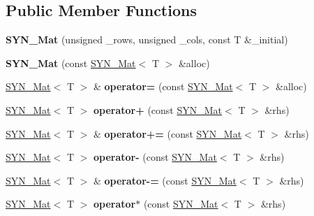 \subsection*{Public Member Functions}
\begin{DoxyCompactItemize}
\item 
\mbox{\label{classSYN__Mat_a81e0af5a7bd32ed70b44f319fc8edc39}} 
{\bfseries S\+Y\+N\+\_\+\+Mat} (unsigned \+\_\+rows, unsigned \+\_\+cols, const T \&\+\_\+initial)
\item 
\mbox{\label{classSYN__Mat_ab6ae892453033358fb394eb337f9722e}} 
{\bfseries S\+Y\+N\+\_\+\+Mat} (const \hyperlink{classSYN__Mat}{S\+Y\+N\+\_\+\+Mat}$<$ T $>$ \&alloc)
\item 
\mbox{\label{classSYN__Mat_a8c26c6e94cafc98eabd4507859a8ef46}} 
\hyperlink{classSYN__Mat}{S\+Y\+N\+\_\+\+Mat}$<$ T $>$ \& {\bfseries operator=} (const \hyperlink{classSYN__Mat}{S\+Y\+N\+\_\+\+Mat}$<$ T $>$ \&alloc)
\item 
\mbox{\label{classSYN__Mat_aab586b6842b14d810db853f0b44bb0d9}} 
\hyperlink{classSYN__Mat}{S\+Y\+N\+\_\+\+Mat}$<$ T $>$ {\bfseries operator+} (const \hyperlink{classSYN__Mat}{S\+Y\+N\+\_\+\+Mat}$<$ T $>$ \&rhs)
\item 
\mbox{\label{classSYN__Mat_ab28a10ef6248599f000585dd1ac52f2b}} 
\hyperlink{classSYN__Mat}{S\+Y\+N\+\_\+\+Mat}$<$ T $>$ \& {\bfseries operator+=} (const \hyperlink{classSYN__Mat}{S\+Y\+N\+\_\+\+Mat}$<$ T $>$ \&rhs)
\item 
\mbox{\label{classSYN__Mat_a604d9395da807c16a38ee58ccbd9626a}} 
\hyperlink{classSYN__Mat}{S\+Y\+N\+\_\+\+Mat}$<$ T $>$ {\bfseries operator-\/} (const \hyperlink{classSYN__Mat}{S\+Y\+N\+\_\+\+Mat}$<$ T $>$ \&rhs)
\item 
\mbox{\label{classSYN__Mat_a0e7915cbc22b0acf1050d98cbf1f8b9f}} 
\hyperlink{classSYN__Mat}{S\+Y\+N\+\_\+\+Mat}$<$ T $>$ \& {\bfseries operator-\/=} (const \hyperlink{classSYN__Mat}{S\+Y\+N\+\_\+\+Mat}$<$ T $>$ \&rhs)
\item 
\mbox{\label{classSYN__Mat_a9b84efa4ab4700395662c912592f140e}} 
\hyperlink{classSYN__Mat}{S\+Y\+N\+\_\+\+Mat}$<$ T $>$ {\bfseries operator$\ast$} (const \hyperlink{classSYN__Mat}{S\+Y\+N\+\_\+\+Mat}$<$ T $>$ \&rhs)

\end{DoxyCompactItemize}

